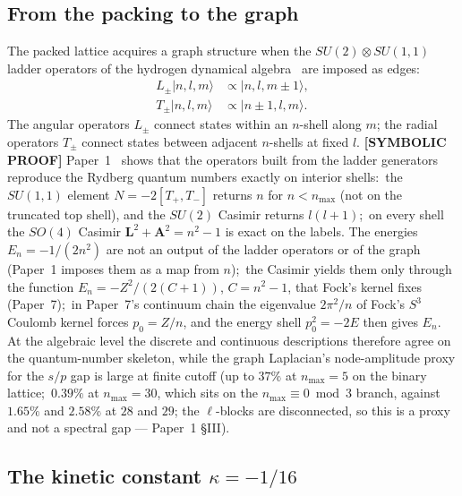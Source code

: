 \documentclass[aps,pra,twocolumn,superscriptaddress,longbibliography]{revtex4-2}
\begin{document}
\subsection*{From the packing to the graph}

The packed lattice acquires a graph structure when the
$SU(2) \otimes SU(1,1)$ ladder operators of the hydrogen dynamical
algebra~\cite{barut1967,biedenharn1981} are imposed as edges:
\begin{align}
L_\pm |n, l, m\rangle &\propto |n, l, m \pm 1\rangle, \\
T_\pm |n, l, m\rangle &\propto |n \pm 1, l, m\rangle.
\end{align}
The angular operators $L_\pm$ connect states within an $n$-shell along
$m$; the radial operators $T_\pm$ connect states between adjacent
$n$-shells at fixed $l$.  \textbf{[SYMBOLIC PROOF]} Paper~1~\cite{loutey_paper1} shows
that the operators built from the ladder generators reproduce the
Rydberg quantum numbers exactly on interior shells:\ the $SU(1,1)$
element $N = -2[T_+, T_-]$ returns $n$ for $n < n_{\max}$ (not on the
truncated top shell), and the $SU(2)$ Casimir returns $l(l+1)$;\ on
every shell the $SO(4)$ Casimir $\mathbf{L}^2 + \mathbf{A}^2 = n^2 - 1$
is exact on the labels.  The energies $E_n = -1/(2n^2)$ are not an
output of the ladder operators or of the graph (Paper~1 imposes them as a
map from $n$);\ the Casimir yields them only through the function
$E_n = -Z^2/(2(C+1))$, $C = n^2-1$, that Fock's kernel fixes (Paper~7);\ in Paper~7's continuum chain the eigenvalue $2\pi^2/n$
of Fock's $S^3$ Coulomb kernel forces $p_0 = Z/n$, and the energy shell
$p_0^2 = -2E$ then gives $E_n$.  At the algebraic level the discrete and continuous
descriptions therefore agree on the quantum-number skeleton, while the
graph Laplacian's node-amplitude proxy for the $s/p$ gap is large at finite
cutoff (up to $37\%$ at $n_{\max} = 5$ on the binary lattice;\ $0.39\%$ at
$n_{\max} = 30$, which sits on the $n_{\max} \equiv 0 \bmod 3$ branch, against
$1.65\%$ and $2.58\%$ at $28$ and $29$; the $\ell$-blocks are disconnected,
so this is a proxy and not a spectral gap --- Paper~1 \S III).

\subsection*{The kinetic constant $\kappa = -1/16$}
\end{document}
